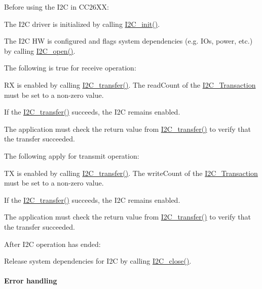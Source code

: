 Before using the I2\-C in C\-C26\-X\-X\-:
\begin{DoxyItemize}
\item The I2\-C driver is initialized by calling \hyperlink{_i2_c_8h_a9ff51ddf1d325776fef90cce0223772b}{I2\-C\-\_\-init()}.
\item The I2\-C H\-W is configured and flags system dependencies (e.\-g. I\-Os, power, etc.) by calling \hyperlink{_i2_c_8h_ae1aa99e1fee4517406018e10025cca0e}{I2\-C\-\_\-open()}.
\end{DoxyItemize}The following is true for receive operation\-:
\begin{DoxyItemize}
\item R\-X is enabled by calling \hyperlink{_i2_c_8h_ac5d827b67fe77d7d179026941cc069d7}{I2\-C\-\_\-transfer()}. The read\-Count of the \hyperlink{struct_i2_c___transaction}{I2\-C\-\_\-\-Transaction} must be set to a non-\/zero value.
\item If the \hyperlink{_i2_c_8h_ac5d827b67fe77d7d179026941cc069d7}{I2\-C\-\_\-transfer()} succeeds, the I2\-C remains enabled.
\item The application must check the return value from \hyperlink{_i2_c_8h_ac5d827b67fe77d7d179026941cc069d7}{I2\-C\-\_\-transfer()} to verify that the transfer succeeded.
\end{DoxyItemize}The following apply for transmit operation\-:
\begin{DoxyItemize}
\item T\-X is enabled by calling \hyperlink{_i2_c_8h_ac5d827b67fe77d7d179026941cc069d7}{I2\-C\-\_\-transfer()}. The write\-Count of the \hyperlink{struct_i2_c___transaction}{I2\-C\-\_\-\-Transaction} must be set to a non-\/zero value.
\item If the \hyperlink{_i2_c_8h_ac5d827b67fe77d7d179026941cc069d7}{I2\-C\-\_\-transfer()} succeeds, the I2\-C remains enabled.
\item The application must check the return value from \hyperlink{_i2_c_8h_ac5d827b67fe77d7d179026941cc069d7}{I2\-C\-\_\-transfer()} to verify that the transfer succeeded.
\end{DoxyItemize}After I2\-C operation has ended\-:
\begin{DoxyItemize}
\item Release system dependencies for I2\-C by calling \hyperlink{_i2_c_8h_a12c86d89a687f2ee1eb980d99c32326d}{I2\-C\-\_\-close()}.
\end{DoxyItemize}

\paragraph*{Error handling}

